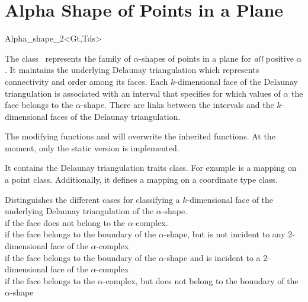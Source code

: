 
\section{Alpha Shape of Points in a Plane \label{I1_SectAlpha Shape_2}}

\begin{ccClassTemplate} {Alpha_shape_2<Gt,Tds>}

\ccDefinition
The class \ccClassTemplateName\ represents the family of
$\alpha$-shapes of points in a plane for {\em all} positive
$\alpha$. It maintains the underlying Delaunay triangulation which
represents connectivity and order among its faces. Each
$k$-dimensional face of the Delaunay triangulation is associated with
an interval that specifies for which values of $\alpha$ the face
belongs to the $\alpha$-shape. There are links between the intervals
and the $k$-dimensional faces of the Delaunay triangulation.



\ccInheritsFrom


The modifying functions  and  will overwrite
the inherited functions. At the moment, only the static version is implemented.

\ccTypes
{}
\ccThreeToTwo

 
It contains the Delaunay triangulation traits class.  For example
 is a mapping on a point class. Additionally,
it defines a mapping on a coordinate type class.



{Distinguishes the different cases for classifying a $k$-dimensional face
 of the underlying Delaunay triangulation of the $\alpha$-shape. \\
 if the face does not belong to the $\alpha$-complex.\\
 if the face belongs to the boundary of the $\alpha$-shape,
 but is not incident to any 2-dimensional face of the $\alpha$-complex\\
 if the face belongs to the boundary of the $\alpha$-shape
 and is incident to a 2-dimensional face of the $\alpha$-complex\\
 if the face belongs to the $\alpha$-complex, but does
not belong to the boundary of the $\alpha$-shape\\}


\end{ccClassTemplate}
